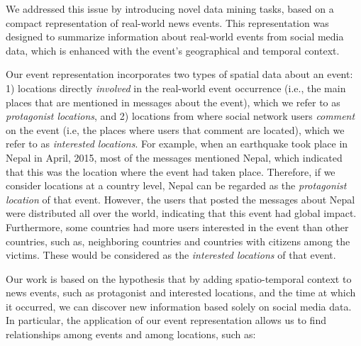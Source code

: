 We addressed this issue by introducing novel data mining tasks, based on a
compact representation of real-world news events. 
%
This representation was designed to summarize information about real-world
events from social media data, which is enhanced with the event's geographical
and temporal context.


Our event representation incorporates two types of spatial data about an event:
%
1) locations directly {\em involved} in the real-world event occurrence (i.e.,
the main places that are mentioned in messages about the event), which we refer
to as {\em protagonist locations}, and 
%
2) locations from where social network users {\em comment} on the event (i.e,
the places where users that comment are located), which we refer to as {\em
interested locations}.  
%
For example, when an earthquake took place in Nepal in April, 2015, most of the
messages mentioned Nepal, which indicated that this was the location where the
event had taken place. 
%
Therefore, if we consider locations at a country level, Nepal can be regarded as
the {\em protagonist location} of that event. 
%
However, the users that posted the messages about Nepal were distributed all
over the world, indicating that this event had global impact. 
%
Furthermore, some countries had more users interested in the event than other
countries, such as, neighboring countries and countries with citizens among the
victims.  
%
These would be considered as the {\em interested locations} of that event.


Our work is based on the hypothesis that by adding spatio-temporal context to
news events, such as protagonist and interested locations, and the time at which
it occurred, we can discover new information based solely on social media data.
%
In particular, the application of our event representation allows us to find
relationships among events and among locations, such as:

